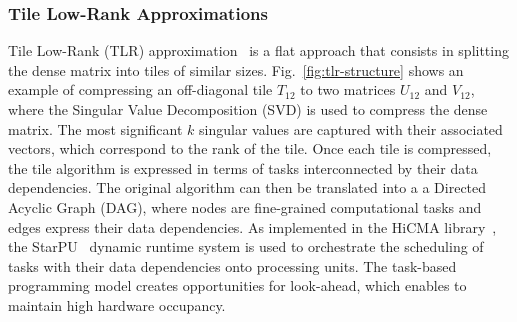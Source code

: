 \documentclass[conference]{IEEEtran}
\begin{document}
\subsubsection{Tile Low-Rank Approximations}
Tile Low-Rank (TLR) approximation~\cite{akbudak2017tile,amestoy2015improving} is a flat approach that consists in splitting the dense matrix
into tiles of similar sizes. Fig.~\ref{fig:tlr-structure} shows an example of compressing 
an off-diagonal tile $T_{12}$ to two matrices $U_{12}$ and $V_{12}$,  
where the Singular Value Decomposition (SVD) is used to compress the dense matrix.
The most significant $k$ singular values are captured with their associated vectors, which
correspond to the rank of the tile.
Once each tile is compressed, the tile algorithm is expressed in terms of
tasks interconnected by their data dependencies. The original algorithm can then be translated into a
a Directed Acyclic Graph (DAG), where nodes are fine-grained computational tasks and edges express
their data dependencies. As implemented in the HiCMA library~\cite{hicma-soft}, the StarPU~\cite{augonnet2011starpu} dynamic runtime system
is used to orchestrate the scheduling of tasks with their data dependencies onto processing units.
The task-based programming model creates opportunities for look-ahead, which enables to maintain
high hardware occupancy.


\end{document}
